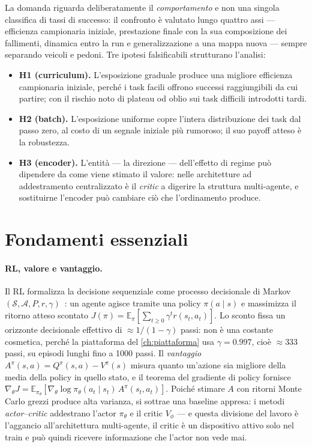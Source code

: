 La domanda riguarda deliberatamente il \emph{comportamento} e non una
singola classifica di tassi di successo: il confronto è valutato lungo
quattro assi --- efficienza campionaria iniziale, prestazione finale con
la sua composizione dei fallimenti, dinamica entro la run e
generalizzazione a una mappa nuova --- sempre separando veicoli e
pedoni. Tre ipotesi falsificabili strutturano l'analisi:

\begin{itemize}
  \item \textbf{H1 (curriculum).} L'esposizione graduale produce una
        migliore efficienza campionaria iniziale, perché i task facili
        offrono successi raggiungibili da cui partire; con il rischio
        noto di plateau od oblio sui task difficili introdotti tardi.
  \item \textbf{H2 (batch).} L'esposizione uniforme copre l'intera
        distribuzione dei task dal passo zero, al costo di un segnale
        iniziale più rumoroso; il suo payoff atteso è la robustezza.
  \item \textbf{H3 (encoder).} L'entità --- la
        direzione --- dell'effetto di regime può dipendere da come viene
        stimato il valore: nelle architetture ad addestramento
        centralizzato è il \emph{critic} a digerire la struttura
        multi-agente, e sostituirne l'encoder può cambiare ciò che
        l'ordinamento produce.
\end{itemize}

\section{Fondamenti essenziali}
\label{sec:fondamenti}

\paragraph{RL, valore e vantaggio.}
Il RL formalizza la decisione sequenziale come processo decisionale di
Markov $(\mathcal{S}, \mathcal{A}, P, r, \gamma)$~\cite{sutton2018rl}:
un agente agisce tramite una policy $\pi(a \mid s)$ e massimizza il
ritorno atteso scontato
$J(\pi) = \mathbb{E}_{\pi}[\sum_{t \geq 0} \gamma^{t} r(s_t,a_t)]$. Lo
sconto fissa un orizzonte decisionale effettivo di $\approx 1/(1-\gamma)$
passi: non è una costante cosmetica, perché la piattaforma del
\cref{ch:piattaforma} usa $\gamma = 0.997$, cioè $\approx 333$ passi, su
episodi lunghi fino a 1000 passi. Il \emph{vantaggio}
$A^{\pi}(s,a) = Q^{\pi}(s,a) - V^{\pi}(s)$ misura quanto un'azione sia
migliore della media della policy in quello stato, e il teorema del
gradiente di policy fornisce
$\nabla_{\theta} J = \mathbb{E}_{\pi_\theta}[\nabla_{\theta}\log\pi_{\theta}(a_t\mid s_t)\,A^{\pi}(s_t,a_t)]$.
Poiché stimare $A$ con ritorni Monte Carlo grezzi produce alta varianza,
si sottrae una baseline appresa: i metodi \emph{actor--critic}
addestrano l'actor $\pi_\theta$ e il critic $V_\phi$ --- e questa
divisione del lavoro è l'aggancio all'architettura multi-agente, 
il critic è un dispositivo attivo solo nel train e può quindi ricevere
informazione che l'actor non vede mai.

